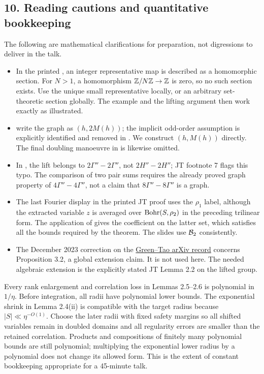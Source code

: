 \subsection*{10. Reading cautions and quantitative bookkeeping}
The following are mathematical clarifications for preparation, not
digressions to deliver in the talk.
\begin{itemize}
\item In the printed , an integer representative map
is described as a homomorphic section. For $N>1$, a homomorphism
$\mathbb Z/N\mathbb Z\to\mathbb Z$ is zero, so no such section exists. Use the unique
small representative locally, or an arbitrary set-theoretic section
globally. The example and the lifting argument then work exactly as
illustrated.
\item {} write the graph as $(h,2M(h))$;
the implicit odd-order assumption is explicitly identified and removed
in . We construct $(h,M(h))$ directly.
The final doubling manoeuvre in  is likewise omitted.
\item In , the lift belongs to
$2\Gamma''-2\Gamma''$, not $2H''-2H''$; JT footnote 7 flags this
typo. The comparison of two pair sums requires the already proved
graph property of $4\Gamma''-4\Gamma''$, not a claim that
$8\Gamma''-8\Gamma''$ is a graph.
\item The last Fourier display in the printed JT proof uses the
$\rho_1$ label, although the extracted variable $z$ is averaged over
$\operatorname{Bohr}(S,\rho_2)$ in the preceding trilinear form. The application of
 gives the coefficient on the latter set, which satisfies
all the bounds required by the theorem. The slides use $\mathcal B_2$
consistently.
\item The December 2023 correction on the
\href{https://arxiv.org/abs/math/0503014}{Green--Tao arXiv record}
concerns Proposition 3.2, a global extension claim. It is not used here.
The needed algebraic extension is the explicitly stated JT Lemma 2.2
on the lifted group.
\end{itemize}
Every rank enlargement and correlation loss in Lemmas 2.5--2.6 is
polynomial in $1/\eta$. Before integration, all radii have polynomial
lower bounds. The exponential shrink in Lemma 2.4(ii) is compatible
with the target radius because $|S|\ll\eta^{-O(1)}$.
Choose the later radii with fixed safety margins so all shifted
variables remain in doubled domains and all regularity errors are
smaller than the retained correlation. Products and compositions of
finitely many polynomial bounds are still polynomial; multiplying
the exponential lower radius by a polynomial does not change its
allowed form. This is the extent of constant bookkeeping appropriate
for a 45-minute talk.

